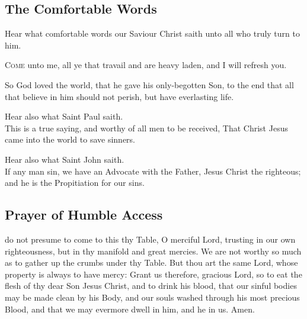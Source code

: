 \subsection{The Comfortable Words}
    Hear what comfortable words our Saviour Christ saith unto all who truly turn to him.\\
\par
\noindent
\textsc{Come} unto me, all ye that travail and are heavy laden, and I will refresh you.\par
    So God loved the world, that he gave his only-begotten Son, to the end that all that believe in him should not perish, but have everlasting life.\\
    \par
    Hear also what Saint Paul saith.\\
    This is a true saying, and worthy of all men to be received, That Christ Jesus came into the world to save sinners.  \\
\par
    Hear also what Saint John saith.\\
    If any man sin, we have an Advocate with the Father, Jesus Christ the righteous; and he is the Propitiation for our sins.  
\subsection{Prayer of Humble Access}
 do not presume to come to this thy Table, O merciful Lord, trusting in our own righteousness, but in thy manifold and great mercies. We are not worthy so much as to gather up the crumbs under thy Table. But thou art the same Lord, whose property is always to have mercy: Grant us therefore, gracious Lord, so to eat the flesh of thy dear Son Jesus Christ, and to drink his blood, that our sinful bodies may be made clean by his Body, and our souls washed through his most precious Blood, and that we may evermore dwell in him, and he in us. Amen.
